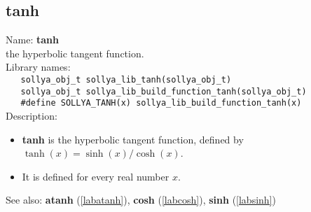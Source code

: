 \subsection{tanh}
\label{labtanh}
\noindent Name: \textbf{tanh}\\
\phantom{aaa}the hyperbolic tangent function.\\[0.2cm]
\noindent Library names:\\
\verb|   sollya_obj_t sollya_lib_tanh(sollya_obj_t)|\\
\verb|   sollya_obj_t sollya_lib_build_function_tanh(sollya_obj_t)|\\
\verb|   #define SOLLYA_TANH(x) sollya_lib_build_function_tanh(x)|\\[0.2cm]
\noindent Description: \begin{itemize}

\item \textbf{tanh} is the hyperbolic tangent function, defined by $\tanh(x) = \sinh(x)/\cosh(x)$.

\item It is defined for every real number $x$.
\end{itemize}
See also: \textbf{atanh} (\ref{labatanh}), \textbf{cosh} (\ref{labcosh}), \textbf{sinh} (\ref{labsinh})
